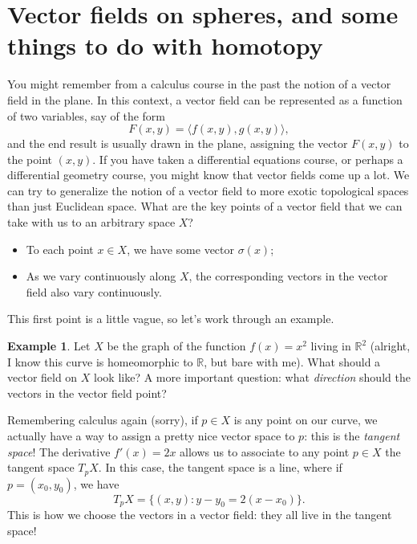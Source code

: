 \documentclass[10pt]{amsart}
\theoremstyle{definition}
\newtheorem{ex}[thm]{Example}
\begin{document}
\section{Vector fields on spheres, and some things to do with homotopy}
You might remember from a calculus course in the past the notion of a vector field in the plane. In this context, a vector field can be represented as a function of two variables, say of the form
\[F(x, y) = \langle f(x,y), g(x,y)\rangle,\]
and the end result is usually drawn in the plane, assigning the vector $F(x, y)$ to the point $(x, y)$. If you have taken a differential equations course, or perhaps a differential geometry course, you might know that vector fields come up a lot. We can try to generalize the notion of a vector field to more exotic topological spaces than just Euclidean space. What are the key points of a vector field that we can take with us to an arbitrary space $X$?
\begin{itemize}
    \item To each point $x \in X$, we have some vector $\sigma(x)$;
    \item As we vary continuously along $X$, the corresponding vectors in the vector field also vary continuously.
\end{itemize}
This first point is a little vague, so let's work through an example.
\begin{ex}
    Let $X$ be the graph of the function $f(x) = x^2$ living in $\mathbb{R}^2$ (alright, I know this curve is homeomorphic to $\mathbb{R}$, but bare with me). What should a vector field on $X$ look like? A more important question: what \emph{direction} should the vectors in the vector field point?

    Remembering calculus again (sorry), if $p \in X$ is any point on our curve, we actually have a way to assign a pretty nice vector space to $p$: this is the \emph{tangent space}! The derivative $f'(x) = 2x$ allows us to associate to any point $p \in X$ the tangent space $T_pX$. In this case, the tangent space is a line, where if $p = (x_0,y_0)$, we have
    \[T_pX = \{(x, y) : y-y_0 = 2(x-x_0)\}.\]
    This is how we choose the vectors in a vector field: they all live in the tangent space!
\end{ex}
\end{document}
